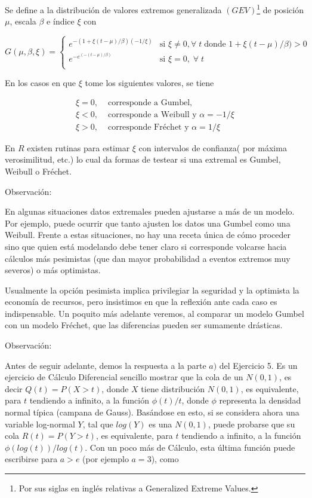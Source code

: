 \documentclass[
]{book}
\theoremstyle{definition}
\theoremstyle{definition}
\theoremstyle{definition}
\theoremstyle{definition}
\theoremstyle{remark}
\begin{document}
Se define a la distribución de valores extremos generalizada \((GEV)\)\footnote{Por sus siglas en inglés relativas a Generalized Extreme Values.} de posición \(\mu\), escala \(\beta\) e índice \(\xi\) con

\[
G(\mu,\beta,\xi) =
\begin{cases}
    e^{-(1+ \xi(t-\mu)/ \beta)(-1/ \xi)} & \text{si  } \xi \neq 0, \forall\;t\;\text{donde } 1+ \xi(t-\mu)/ \beta) >0 \\
    e^{-e^{(-(t-\mu)/ \beta)}} & \text{si  } \xi =0,\; \forall \;t \\
\end{cases}
\]
\vspace{0.5cm}

En los casos en que \(\xi\) tome los siguientes valores, se tiene

\begin{align*}
 \xi=0,  & \text{ corresponde a Gumbel,} \\
 \xi< 0, &\text{ corresponde a Weibull y } \alpha=-1/ \xi \\
 \xi>0, &\text{ corresponde Fréchet y }  \alpha=1/ \xi
\end{align*}

En \(R\) existen rutinas para estimar \(\xi\) con intervalos de confianza( por máxima verosimilitud, etc.) lo cual da formas de testear si una extremal es Gumbel, Weibull o Fréchet.

Observación:

En algunas situaciones datos extremales pueden ajustarse a más de un modelo. Por ejemplo, puede ocurrir que tanto ajusten los datos una Gumbel como una Weibull. Frente a estas situaciones, no hay una receta única de cómo proceder sino que quien está modelando debe tener claro si corresponde volcarse hacia cálculos más pesimistas (que dan mayor probabilidad a eventos extremos muy severos) o más optimistas.

Usualmente la opción pesimista implica privilegiar la seguridad y la optimista la economía de recursos, pero insistimos en que la reflexión ante cada caso es indispensable. Un poquito más adelante veremos, al comparar un modelo Gumbel con un modelo Fréchet, que las diferencias pueden ser sumamente drásticas.

Observación:

Antes de seguir adelante, demos la respuesta a la parte \(a)\) del Ejercicio 5. Es un ejercicio de Cálculo Diferencial sencillo mostrar que la cola de un \(N(0,1)\), es decir \(Q(t)=P(X>t)\), donde \(X\) tiene distribución \(N(0,1)\), es equivalente, para \(t\) tendiendo a infinito, a la función \(\phi(t)/t\), donde \(\phi\) representa la densidad normal típica (campana de Gauss). Basándose en esto, si se considera ahora una variable log-normal \(Y\), tal que \(log(Y)\) es una \(N(0,1)\), puede probarse que su cola \(R(t)=P(Y>t)\), es equivalente, para \(t\) tendiendo a infinito, a la función \(\phi(log(t))/log(t)\). Con un poco más de Cálculo, esta última función puede escribirse para \(a>e\) (por ejemplo \(a=3\)), como
\end{document}
